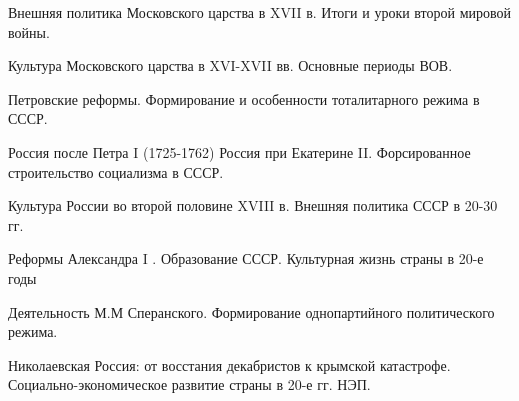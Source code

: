 \documentclass[
	14pt,
	a4paper,
	]
	{scrartcl}
\begin{document}
\vfill
\z 	Внешняя политика Московского царства в XVII в.
 \vfill
\z 	Итоги и уроки второй мировой войны.
 \vfill

\vfill

\newpage


\shapk
{}
\setcounter{zad}{0}

\vfill
\z 	Культура Московского царства в XVI-XVII вв.
 \vfill
\z 	Основные периоды ВОВ.
 \vfill

\vfill

\newpage


\shapk
{}
\setcounter{zad}{0}

\vfill
\z 	Петровские реформы.
 \vfill
\z 	Формирование и особенности тоталитарного режима в СССР.
 \vfill

\vfill

\newpage


\shapk
{}
\setcounter{zad}{0}

\vfill
\z 	Россия после Петра I (1725-1762)	Россия при Екатерине II.
 \vfill
\z 	Форсированное строительство социализма в СССР.
 \vfill

\vfill

\newpage


\shapk
{}
\setcounter{zad}{0}

\vfill
\z 	Культура России во второй половине XVIII в.
 \vfill
\z 	Внешняя политика СССР в 20-30 гг.
 \vfill

\vfill

\newpage


\shapk
{}
\setcounter{zad}{0}

\vfill
\z 	Реформы Александра I .
 \vfill
\z 	Образование СССР. Культурная жизнь страны в 20-е годы
 \vfill

\vfill

\newpage


\shapk
{}
\setcounter{zad}{0}

\vfill
\z 	Деятельность М.М Сперанского.
 \vfill
\z 	Формирование однопартийного политического режима.
 \vfill

\vfill

\newpage


\shapk
{}
\setcounter{zad}{0}

\vfill
\z 	Николаевская Россия: от восстания декабристов к крымской катастрофе.
 \vfill
\z 	Социально-экономическое развитие страны в 20-е гг. НЭП.
 \vfill
\end{document}
